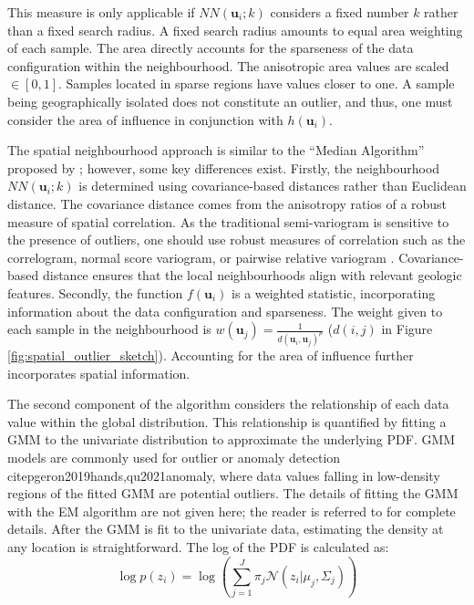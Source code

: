 This measure is only applicable if $NN(\mathbf{u}_{i}; k)$ considers a fixed number $k$ rather than a fixed search radius. A fixed search radius amounts to equal area weighting of each sample. The area directly accounts for the sparseness of the data configuration within the neighbourhood. The anisotropic area values are scaled $\in [0,1]$. Samples located in sparse regions have values closer to one. A sample being geographically isolated does not constitute an outlier, and thus, one must consider the area of influence in conjunction with $h(\mathbf{u}_{i})$.

The spatial neighbourhood approach is similar to the ``Median Algorithm'' proposed by \cite{chen2008detecting}; however, some key differences exist. Firstly, the neighbourhood $NN(\mathbf{u}_{i}; k)$ is determined using covariance-based distances rather than Euclidean distance. The covariance distance comes from the anisotropy ratios of a robust measure of spatial correlation. As the traditional semi-variogram is sensitive to the presence of outliers, one should use robust measures of correlation such as the correlogram, normal score variogram, or pairwise relative variogram \citep{babakhani2014geostatistical,drumond2019using}. Covariance-based distance ensures that the local neighbourhoods align with relevant geologic features. Secondly, the function $f(\mathbf{u}_{i})$ is a weighted statistic, incorporating information about the data configuration and sparseness. The weight given to each sample in the neighbourhood is $w(\mathbf{u}_{j})=\frac{1}{d(\mathbf{u}_{i},\mathbf{u}_{j})^{p}}$ ($d(i,j)$ in Figure \ref{fig:spatial_outlier_sketch}). Accounting for the area of influence further incorporates spatial information.

The second component of the algorithm considers the relationship of each data value within the global distribution. This relationship is quantified by fitting a \gls{GMM} to the univariate distribution to approximate the underlying \gls{PDF}. \Gls{GMM} models are commonly used for outlier or anomaly detection citep{geron2019hands,qu2021anomaly}, where data values falling in low-density regions of the fitted \gls{GMM} are potential outliers. The details of fitting the \gls{GMM} with the \gls{EM} algorithm are not given here; the reader is referred to \cite{mclachlan2019finite} for complete details. After the \gls{GMM} is fit to the univariate data, estimating the density at any location is straightforward. The log of the \gls{PDF} is calculated as:
\begin{equation}
    \log p(z_{i}) = \log \left( \sum_{j=1}^{J} \pi_{j} \mathcal{N}(z_{i}|\mu_{j}, \Sigma_{j}) \right)
    \label{eq:logprob}
\end{equation}

